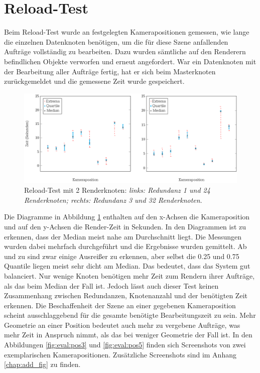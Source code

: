 \section{Reload-Test}
\label{sec:eval:reload}
Beim Reload-Test wurde an festgelegten Kamerapositionen gemessen, wie lange die einzelnen Datenknoten benötigen, um die für diese Szene anfallenden Aufträge vollständig zu bearbeiten. Dazu wurden sämtliche auf den Renderern befindlichen Objekte verworfen und erneut angefordert. War ein Datenknoten mit der Bearbeitung aller Aufträge fertig, hat er sich beim Masterknoten zurückgemeldet und die gemessene Zeit wurde gespeichert.
\begin{figure}
\centering
\includegraphics[scale=0.75]{images/diag_reload.pdf}
  \caption{\label{fig:eval:reload}Reload-Test mit 2 Renderknoten: \textit{links: Redundanz 1 und 24 Renderknoten; rechts: Redundanz 3 und 32 Renderknoten}.}
\end{figure}
Die Diagramme in Abbildung \ref{fig:eval:reload} enthalten auf den x-Achsen die Kameraposition und auf den y-Achsen die Render-Zeit in Sekunden. In den Diagrammen ist zu erkennen, dass der Median meist nahe am Durchschnitt liegt. Die Messungen wurden dabei mehrfach durchgeführt und die Ergebnisse wurden gemittelt. Ab und zu sind zwar einige Ausreißer zu erkennen, aber selbst die 0.25 und 0.75 Quantile liegen meist sehr dicht am Median. Das bedeutet, dass das System gut balanciert. Nur wenige Knoten benötigen mehr Zeit zum Rendern ihrer Aufträge, als das beim Median der Fall ist. Jedoch lässt auch dieser Test keinen Zusammenhang zwischen Redundanzen, Knotenanzahl und der benötigten Zeit erkennen. Die Beschaffenheit der Szene an einer gegebenen Kameraposition scheint ausschlaggebend für die gesamte benötigte Bearbeitungszeit zu sein. Mehr Geometrie an einer Position bedeutet auch mehr zu vergebene Aufträge, was mehr Zeit in Anspruch nimmt, als das bei weniger Geometrie der Fall ist. In den Abbildungen \ref{fig:eval:pos3} und \ref{fig:eval:pos5} finden sich Screenshots von zwei exemplarischen Kamerapositionen. Zusätzliche Screenshots sind im Anhang \ref{chap:add_fig} zu finden.
